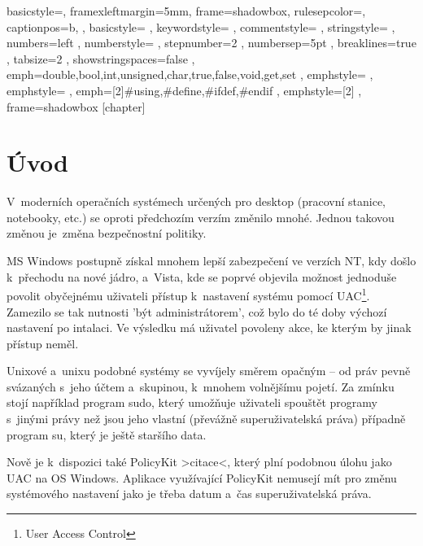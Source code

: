 \renewcommand*\lstlistingname{Výpis}
\setlength{\parskip}{3pt plus 1pt minus 1pt}
\lstset
{
    basicstyle=\footnotesize,
    framexleftmargin=5mm,
    frame=shadowbox,
    rulesepcolor=\color{blue},
    captionpos=b,
, basicstyle=\footnotesize\ttfamily
, keywordstyle=\color{blue}
, commentstyle=\color{OliveGreen}
, stringstyle=\color{Maroon}
, numbers=left
, numberstyle=\scriptsize
, stepnumber=2
, numbersep=5pt
, breaklines=true
, tabsize=2
, showstringspaces=false
, emph={double,bool,int,unsigned,char,true,false,void,get,set}
, emphstyle=\color{blue}
, emphstyle=\color{red}
, emph={[2]\#using,\#define,\#ifdef,\#endif}
, emphstyle={[2]\color{blue}}
, frame=shadowbox
}
[chapter]
\newcommand{\cppc}[1]{\lstinline[language=C++]$#1$}

\chapter{Úvod}
V~moderních operačních systémech určených pro desktop (pracovní stanice, notebooky, etc.) se oproti předchozím verzím změnilo mnohé. Jednou takovou změnou je~změna bezpečnostní politiky.

MS Windows postupně získal mnohem lepší zabezpečení ve verzích NT, kdy došlo k~přechodu na nové jádro, a~Vista, kde se poprvé objevila možnost jednoduše povolit obyčejnému uživateli přístup k~nastavení systému pomocí UAC\footnote{User Access Control}. Zamezilo se tak nutnosti 'být administrátorem', což bylo do té doby výchozí nastavení po intalaci. Ve výsledku má uživatel povoleny akce, ke kterým by jinak přístup neměl.

Unixové a~unixu podobné systémy se vyvíjely směrem opačným -- od práv pevně svázaných s~jeho účtem a~skupinou, k~mnohem volnějšímu pojetí. Za zmínku stojí například program sudo, který umožňuje uživateli spouštět programy s~jinými právy než jsou jeho vlastní (převážně superuživatelská práva) případně program su, který je ještě staršího data.

Nově je k~dispozici také PolicyKit >citace<, který plní podobnou úlohu jako UAC na OS Windows. Aplikace využívající PolicyKit nemusejí mít pro změnu systémového nastavení jako je třeba datum a~čas superuživatelská práva.

